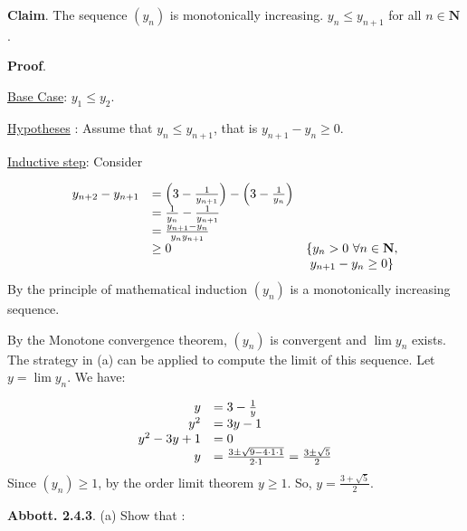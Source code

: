 \documentclass[10pt]{article}
\begin{document}
\textbf{Claim}. The sequence $\displaystyle ( y_{n})$ is monotonically increasing. $\displaystyle y_{n} \leq y_{n+1}$ for all $\displaystyle n\in \mathbf{N}$.



\textbf{Proof}.



\underline{Base Case}: $\displaystyle y_{1} \leq y_{2}$.



\underline{Hypotheses} : Assume that $\displaystyle y_{n} \leq y_{n+1}$, that is $\displaystyle y_{n+1} -y_{n} \geq 0$.



\underline{Inductive step}: Consider


\begin{equation*}
\begin{array}{ c l c }
y_{n+2} -y_{n+1} & =\left( 3-\frac{1}{y_{n+1}}\right) -\left( 3-\frac{1}{y_{n}}\right) & \\
 & =\frac{1}{y_{n}} -\frac{1}{y_{n+1}} & \\
 & =\frac{y_{n+1} -y_{n}}{y_{n} y_{n+1}} & \\
 & \geq 0 & \{y_{n}  >0\ \forall n\in \mathbf{N} ,\\
 &  & y_{n+1} -y_{n} \geq 0\}
\end{array}
\end{equation*}
By the principle of mathematical induction $\displaystyle ( y_{n})$ is a monotonically increasing sequence.



By the Monotone convergence theorem, $\displaystyle ( y_{n})$ is convergent and $\displaystyle \lim y_{n}$ exists. The strategy in (a) can be applied to compute the limit of this sequence. Let $\displaystyle y=\lim y_{n}$. We have:


\begin{equation*}
\begin{array}{ r l }
y & =3-\frac{1}{y}\\
y^{2} & =3y-1\\
y^{2} -3y+1 & =0\\
y & =\frac{3\pm \sqrt{9-4\cdot 1\cdot 1}}{2\cdot 1} =\frac{3\pm \sqrt{5}}{2}
\end{array}
\end{equation*}
Since $\displaystyle ( y_{n}) \geq 1$, by the order limit theorem $\displaystyle y\geq 1$. So, $\displaystyle y=\frac{3+\sqrt{5}}{2}$.



\textbf{Abbott. 2.4.3}. (a) Show that :
\end{document}
